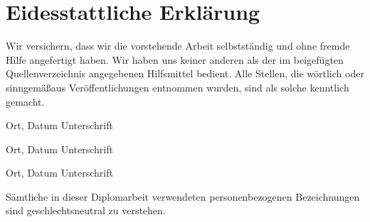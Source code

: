 \chapter*{Eidesstattliche Erkl\"arung}

Wir versichern, dass wir die vorstehende Arbeit selbstst\"andig und ohne fremde Hilfe angefertigt haben. Wir haben uns keiner anderen als der im beigef\"ugten Quellenverzeichnis angegebenen Hilfsmittel bedient. Alle Stellen, die w\"ortlich oder sinngem\"a\ss aus Ver\"offentlichungen entnommen wurden, sind als solche kenntlich gemacht.


\vspace{2.5cm}

\hspace{2cm} Ort, Datum \hfill Unterschrift \hspace{2cm}

\vspace{2cm}

\hspace{2cm} Ort, Datum \hfill Unterschrift \hspace{2cm}

\vspace{2cm}

\hspace{2cm} Ort, Datum \hfill Unterschrift \hspace{2cm}

\vspace{2cm}

\begin{center}
S\"amtliche in dieser Diplomarbeit verwendeten personenbezogenen Bezeichnungen sind geschlechtsneutral zu verstehen.
\end{center}